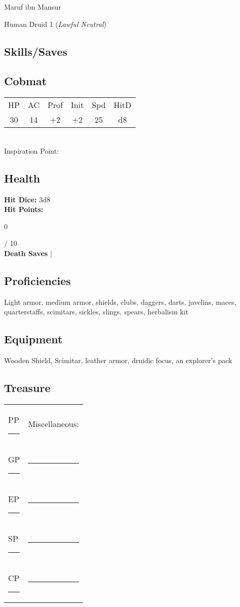 \documentclass[letterpaper,10pt,twoside,twocolumn,openany]{book}
\begin{document}
{\LARGE{Maruf ibn Mansur}}

Human Druid 1 (\textit{Lawful Neutral})

\subsection{Skills/Saves}
\saves[
    STR=\stat{9},
    DEX=\stat{16},
    CON=\stat{10},
    INT=\stat{10},
    WIS=\stat{16},
    CHA=\stat{15},
]

\subsection{Cobmat}
\begin{tabular}{cccccc}
  HP & AC & Prof & Init & Spd & HitD \\
  30 & 14 & +2   & +2   & 25  & d8   \\
\end{tabular}\\[2pt]
Inspiration Point: \Circle

\subsection{Health}
\begingroup
  \unskip\color{titlered}
  \textbf{Hit Dice:} 3d8 \Circle \Circle \Circle \\
	\textbf{Hit Points:} \parbox[l][1em][c]{1em}{0} / 10 \\
	\textbf{Death Saves} \Circle \Circle \Circle \vspace{1em}|\vspace{1em} \Circle \Circle \Circle \\
\endgroup

\subsection{Proficiencies}
Light armor, medium armor, shields, clubs, daggers, darts, javelins, maces, quarterstaffs, scimitars, sickles, slings, spears, herbalism kit

\subsection{Equipment}
Wooden Shield, Scimitar, leather armor, druidic focus, an explorer's pack

\subsection{Treasure}
\begin{tabular}{ll}
PP \rule{.5in}{.2pt} &Miscellaneous:\\
GP \rule{.5in}{.2pt} &\rule{2.2in}{.2pt}\\
EP \rule{.5in}{.2pt} &\rule{2.2in}{.2pt}\\
SP \rule{.5in}{.2pt} &\rule{2.2in}{.2pt}\\
CP \rule{.5in}{.2pt} &\rule{2.2in}{.2pt}\\
\end{tabular}
\end{document}
